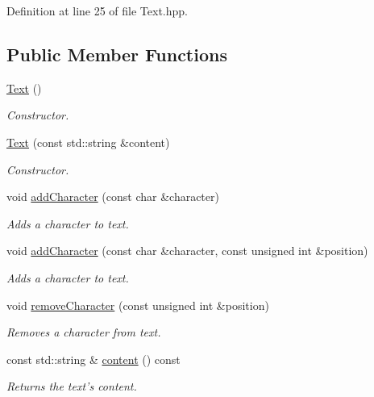Definition at line 25 of file Text.hpp.\subsection*{Public Member Functions}
\begin{CompactItemize}
\item 
\hyperlink{class_text_b3e26143fccc52699bcc5149cae852bc}{Text} ()
\begin{CompactList}\small\item\em Constructor. \item\end{CompactList}\item 
\hyperlink{class_text_d8c7b52db022f4351e31b2b7609a8180}{Text} (const std::string \&content)
\begin{CompactList}\small\item\em Constructor. \item\end{CompactList}\item 
void \hyperlink{class_text_6e6da63c90af68639adc7dd1336f6bf9}{addCharacter} (const char \&character)
\begin{CompactList}\small\item\em Adds a character to text. \item\end{CompactList}\item 
void \hyperlink{class_text_fdd11ad0c90ca483d4cff3d74a64da9e}{addCharacter} (const char \&character, const unsigned int \&position)
\begin{CompactList}\small\item\em Adds a character to text. \item\end{CompactList}\item 
void \hyperlink{class_text_e04500eeada2a4a3bb00554b32263c52}{removeCharacter} (const unsigned int \&position)
\begin{CompactList}\small\item\em Removes a character from text. \item\end{CompactList}\item 
const std::string \& \hyperlink{class_text_8b6ac381338c5b3f719600b5f9be222c}{content} () const 
\begin{CompactList}\small\item\em Returns the text's content. \item\end{CompactList}\item 

\end{CompactItemize}
